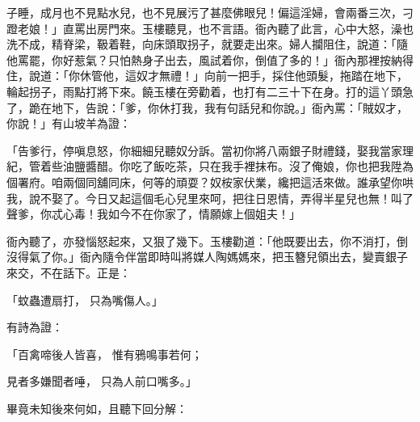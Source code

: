 子睡，成月也不見點水兒，也不見展污了甚麼佛眼兒！偏這淫婦，會兩番三次，刁蹬老娘！」直罵出房門來。玉樓聽見，也不言語。衙內聽了此言，心中大怒，澡也洗不成，精脊梁，靸着鞋，向床頭取拐子，就要走出來。婦人攔阻住，說道：「隨他罵罷，你好惹氣？只怕熱身子出去，風試着你，倒值了多的！」衙內那裡按納得住，說道：「你休管他，這奴才無禮！」向前一把手，採住他頭髮，拖踏在地下，輪起拐子，雨點打將下來。饒玉樓在旁勸着，也打有二三十下在身。打的這丫頭急了，跪在地下，告說：「爹，你休打我，我有句話兒和你說。」衙內罵：「賊奴才，你說！」有山坡羊為證：

「告爹行，停嗔息怒，你細細兒聽奴分訴。當初你將八兩銀子財禮錢，娶我當家理紀，管着些油鹽醬醋。你吃了飯吃茶，只在我手裡抹布。沒了俺娘，你也把我陞為個署府。咱兩個同舖同床，何等的頑耍？奴桉家伏業，纔把這活來做。誰承望你哄我，說不娶了。今日又起這個毛心兒里來呵，把往日恩情，弄得半星兒也無！叫了聲爹，你忒心毒！我如今不在你家了，情願嫁上個姐夫！」

衙內聽了，亦發惱怒起來，又狠了幾下。玉樓勸道：「他既要出去，你不消打，倒沒得氣了你。」衙內隨令伴當即時叫將媒人陶媽媽來，把玉簪兒領出去，變賣銀子來交，不在話下。正是：

「蚊蟲遭扇打，  只為嘴傷人。」

有詩為證：

「百禽啼後人皆喜，  惟有鴉鳴事若何；

見者多嫌聞者唾，  只為人前口嘴多。」

畢竟未知後來何如，且聽下回分解：

